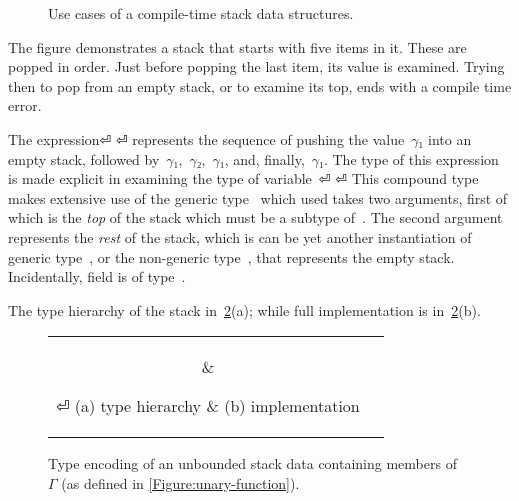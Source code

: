 \begin{figure}[htb]
  \caption{\label{Figure:stack-use-cases}%
    Use cases of a compile-time stack data structures.
  }
\end{figure}

The figure demonstrates a stack that starts with five items in it.
These are popped in order. Just before popping the last item, its 
  value is examined.
Trying then to pop from an empty stack, or to examine its top, ends with 
  a compile time error.

The expression⏎
\mbox{\qquad\qquad}⏎
represents the sequence of pushing the value~$γ₁$ into an
  empty stack, followed by~$γ₁$,~$γ₂$,~$γ₁$, and, finally,~$γ₁$.
The type of this expression is made explicit in examining the type of variable~⏎
\mbox{\qquad\qquad}⏎
This compound type makes extensive use of the generic type~ which used takes two arguments,
  first of which is the \emph{top} of the stack
    which must be a subtype of~.
The second argument represents the \emph{rest} of the stack, which is can be yet another instantiation
    of generic type~, or the non-generic type~, that represents the empty stack.
    Incidentally,  field  is of type~.

The type hierarchy of the stack in~\cref{Figure:stack-encoding}(a);
  while full \Java implementation is in~\cref{Figure:stack-encoding}(b).

\begin{figure}[htb]
  \caption{\label{Figure:stack-encoding} Type encoding of an unbounded
  stack data containing members of~$Γ$ (as defined in \cref{Figure:unary-function}).}
    \begin{tabular}{cc}
      \hspace{-12ex}
      \parbox[c]{0.3\linewidth}{%
        
      }
      &
      \hspace{-4ex}
      \parbox[c]{75ex}{}
⏎
      \hspace{-12ex} (a) type hierarchy & (b) implementation
    \end{tabular}
\end{figure}

